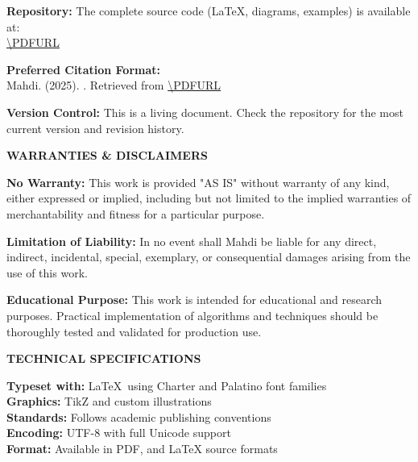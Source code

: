 \begin{flushleft}
{		\textbf{Repository:} The complete source code (LaTeX, diagrams, examples) is available at:\\
		\url{\PDFURL}
		
		\textbf{Preferred Citation Format:}\\
		Mahdi. (2025). \textit{\PDFTitle}. Retrieved from \url{\PDFURL}
		
		\textbf{Version Control:} This is a living document. Check the repository for the most current version and revision history.
		
		\vspace{1.5em}
		
		\begin{center}
			\textbf{WARRANTIES \& DISCLAIMERS}
		\end{center}
		
		\textbf{No Warranty:} This work is provided "AS IS" without warranty of any kind, either expressed or implied, including but not limited to the implied warranties of merchantability and fitness for a particular purpose.
		
		\textbf{Limitation of Liability:} In no event shall Mahdi be liable for any direct, indirect, incidental, special, exemplary, or consequential damages arising from the use of this work.
		
		\textbf{Educational Purpose:} This work is intended for educational and research purposes. Practical implementation of algorithms and techniques should be thoroughly tested and validated for production use.
		
		\vspace{1.5em}
		
		\begin{center}
			\textbf{TECHNICAL SPECIFICATIONS}
		\end{center}
		
		\textbf{Typeset with:} \LaTeX\ using Charter and Palatino font families\\
		\textbf{Graphics:} TikZ and custom illustrations\\
		\textbf{Standards:} Follows academic publishing conventions\\
		\textbf{Encoding:} UTF-8 with full Unicode support\\
		\textbf{Format:} Available in PDF, and LaTeX source formats
	}
\end{flushleft}

